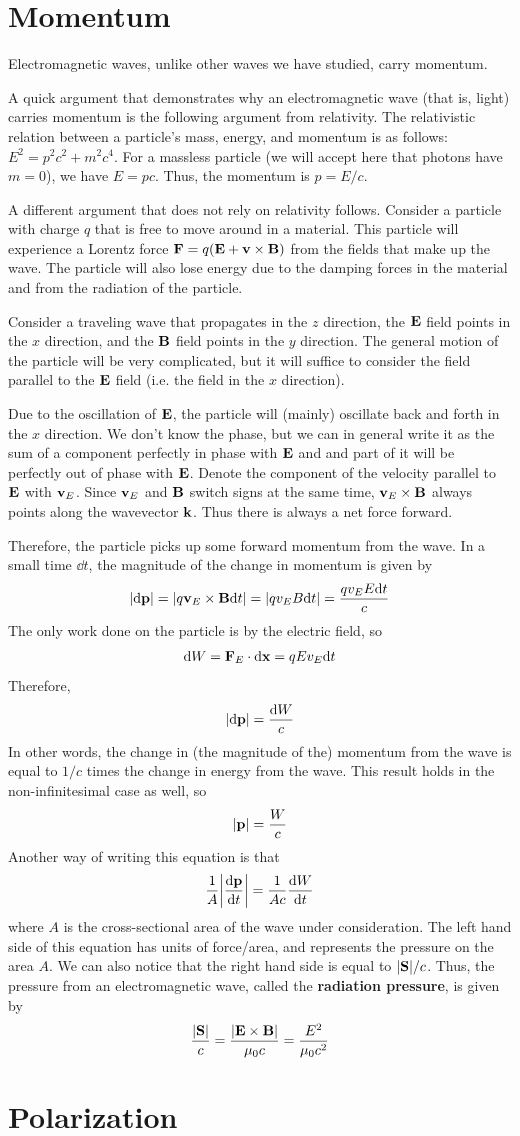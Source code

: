 \section{Momentum}
Electromagnetic waves, unlike other waves we have studied, carry momentum. 

A quick argument that demonstrates why an electromagnetic wave (that is, light) carries momentum is the following argument from relativity. The relativistic relation between a particle's mass, energy, and momentum is as follows: $E^2 = p^2c^2 + m^2c^4$. For a massless particle (we will accept here that photons have $m=0$), we have $E = pc$. Thus, the momentum is $p = E/c$.

A different argument that does not rely on relativity follows. Consider a particle with charge $q$ that is free to move around in a material. This particle will experience a Lorentz force $\mathbf{F} = q(\mathbf{E} + \mathbf{v} \times \mathbf{B})$ from the fields that make up the wave. The particle will also lose energy due to the damping forces in the material and from the radiation of the particle.

Consider a traveling wave that propagates in the $z$ direction, the $\mathbf{E}$ field points in the $x$ direction, and the $\mathbf{B}$ field points in the $y$ direction. The general motion of the particle will be very complicated, but it will suffice to consider the field parallel to the $\mathbf{E}$ field (i.e. the field in the $x$ direction). 

Due to the oscillation of $\mathbf{E}$, the particle will (mainly) oscillate back and forth in the $x$ direction. We don't know the phase, but we can in general write it as the sum of a component perfectly in phase with $\mathbf{E}$ and and part of it will be perfectly out of phase with $\mathbf{E}$. Denote the component of the velocity parallel to $\mathbf{E}$ with $\mathbf{v}_E$. Since $\mathbf{v}_E$ and $\mathbf{B}$ switch signs at the same time, $\mathbf{v}_E\times \mathbf{B}$ always points along the wavevector $\mathbf{k}$. Thus there is always a net force forward. 

Therefore, the particle picks up some forward momentum from the wave. In a small time $\dd t$, the magnitude of the change in momentum is given by
\[ \abs{\dd \mathbf{p}} = \abs{q\mathbf{v}_E\times \mathbf{B}\dd t} = \abs{qv_EB\dd t} = \frac{qv_EE \dd t}{c}\]
The only work done on the particle is by the electric field, so 
\[ \dd W = \mathbf{F}_E \cdot \dd \mathbf{x} = qEv_E\dd t\]
Therefore,
\[ \abs{\dd \mathbf{p}} = \frac{\dd W}{c} \]
In other words, the change in (the magnitude of the) momentum from the wave is equal to $1/c$ times the change in energy from the wave. This result holds in the non-infinitesimal case as well, so
\[ \abs{\mathbf{p}} = \frac{W}{c} \]
Another way of writing this equation is that
\[ \frac{1}{A}\abs{\dv{\mathbf{p}}{t}} = \frac{1}{Ac}\dv{W}{t}\]
where $A$ is the cross-sectional area of the wave under consideration. The left hand side of this equation has units of force/area, and represents the pressure on the area $A$. We can also notice that the right hand side is equal to $|\mathbf{S}|/c$. Thus, the pressure from an electromagnetic wave, called the \textbf{radiation pressure}, is given by
\[ \frac{|\mathbf{S}|}{c} = \frac{|\mathbf{E}\times \mathbf{B}|}{\mu_0 c} = \frac{E^2}{\mu_0c^2}\]
\section{Polarization}
